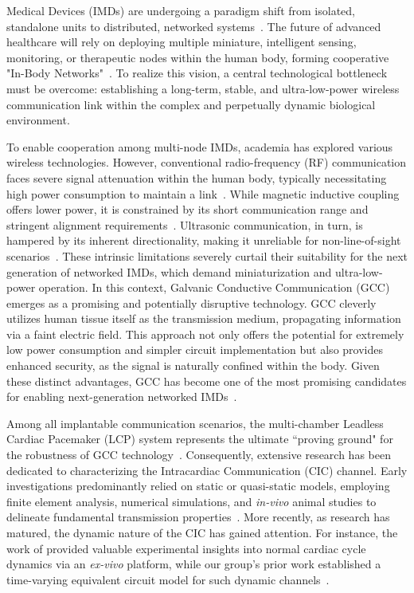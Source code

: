 \documentclass[journal]{IEEEtran}
\begin{document}
 Medical Devices (IMDs) are undergoing a paradigm shift from isolated, standalone units to distributed, networked systems~\cite{Ferguson2011WirelessCW,zrenner2002will,laizou1999signal,Germanovix2000DesignOA}. The future of advanced healthcare will rely on deploying multiple miniature, intelligent sensing, monitoring, or therapeutic nodes within the human body, forming cooperative "In-Body Networks"~\cite{estudillo2010intrabody,warren2010wireless,lin2014design}. To realize this vision, a central technological bottleneck must be overcome: establishing a long-term, stable, and ultra-low-power wireless communication link within the complex and perpetually dynamic biological environment.

To enable cooperation among multi-node IMDs, academia has explored various wireless technologies. However, conventional radio-frequency (RF) communication faces severe signal attenuation within the human body, typically necessitating high power consumption to maintain a link~\cite{bose2018rf}. While magnetic inductive coupling offers lower power, it is constrained by its short communication range and stringent alignment requirements~\cite{li2018200mb}. Ultrasonic communication, in turn, is hampered by its inherent directionality, making it unreliable for non-line-of-sight scenarios~\cite{seyedi2013survey}. These intrinsic limitations severely curtail their suitability for the next generation of networked IMDs, which demand miniaturization and ultra-low-power operation. In this context, Galvanic Conductive Communication (GCC) emerges as a promising and potentially disruptive technology. GCC cleverly utilizes human tissue itself as the transmission medium, propagating information via a faint electric field. This approach not only offers the potential for extremely low power consumption and simpler circuit implementation but also provides enhanced security, as the signal is naturally confined within the body. Given these distinct advantages, GCC has become one of the most promising candidates for enabling next-generation networked IMDs~\cite{wu2020equivalent, opie2004heart, Wegmueller2010Signal, 2016Galvanically}.

Among all implantable communication scenarios, the multi-chamber Leadless Cardiac Pacemaker (LCP) system represents the ultimate ``proving ground" for the robustness of GCC technology~\cite{middour2021leadless, malaczynska2023leadless,li2025dynamic}. Consequently, extensive research has been dedicated to characterizing the Intracardiac Communication (CIC) channel. Early investigations predominantly relied on static or quasi-static models, employing finite element analysis, numerical simulations, and \textit{in-vivo} animal studies to delineate fundamental transmission properties~\cite{bereuter2018fundamental, wang2024analysis,khaleghi2020conductive, maldari2020wide}. More recently, as research has matured, the dynamic nature of the CIC has gained attention. For instance, the work of \cite{chen2022investigation} provided valuable experimental insights into normal cardiac cycle dynamics via an \textit{ex-vivo} platform, while our group's prior work established a time-varying equivalent circuit model for such dynamic channels~\cite{li2025Adynamic}.
\end{document}
